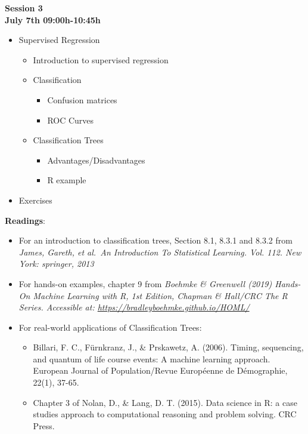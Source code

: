 \documentclass[
]{book}
\providecommand{\tightlist}{%
  \setlength{\itemsep}{0pt}\setlength{\parskip}{0pt}}
\begin{document}
\textbf{Session 3}\\
\textbf{July 7th 09:00h-10:45h}

\begin{itemize}
\tightlist
\item
  Supervised Regression

  \begin{itemize}
  \tightlist
  \item
    Introduction to supervised regression
  \item
    Classification

    \begin{itemize}
    \tightlist
    \item
      Confusion matrices
    \item
      ROC Curves
    \end{itemize}
  \item
    Classification Trees

    \begin{itemize}
    \tightlist
    \item
      Advantages/Disadvantages
    \item
      R example\\
    \end{itemize}
  \end{itemize}
\item
  Exercises
\end{itemize}

\textbf{Readings}:

\begin{itemize}
\item
  For an introduction to classification trees, Section 8.1, 8.3.1 and 8.3.2 from \emph{James, Gareth, et al.~An Introduction To Statistical Learning. Vol. 112. New York: springer, 2013}
\item
  For hands-on examples, chapter 9 from \emph{Boehmke \& Greenwell (2019) Hands-On Machine Learning with R, 1st Edition, Chapman \& Hall/CRC The R Series. Accessible at: \url{https://bradleyboehmke.github.io/HOML/}}
\item
  For real-world applications of Classification Trees:

  \begin{itemize}
  \item
    Billari, F. C., Fürnkranz, J., \& Prskawetz, A. (2006). Timing, sequencing, and quantum of life course events: A machine learning approach. European Journal of Population/Revue Européenne de Démographie, 22(1), 37-65.
  \item
    Chapter 3 of Nolan, D., \& Lang, D. T. (2015). Data science in R: a case studies approach to computational reasoning and problem solving. CRC Press.
  \end{itemize}
\end{itemize}
\end{document}
